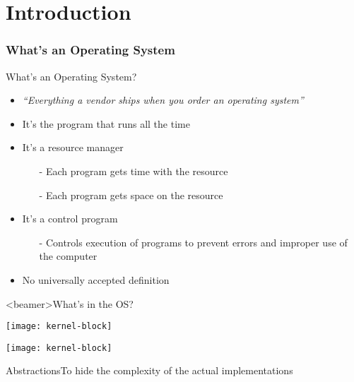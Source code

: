 \mode*
\part{Introduction}


\section{What's an Operating System}

\begin{frame}{What's an Operating System?}
  \begin{itemize}
  \item \emph{``Everything a vendor ships when you order an operating system''}
  \item It's the program that runs all the time
  \item It's a \alert{resource manager}
    \begin{itemize}
    \item[-] Each program gets time with the resource
    \item[-] Each program gets space on the resource
    \end{itemize}
  \item It's a \alert{control program}
    \begin{itemize}
    \item[-] Controls execution of programs to prevent errors and improper use of the
      computer
    \end{itemize}
  \item No universally accepted definition
  \end{itemize}
\end{frame}

\begin{frame}<beamer>{What's in the OS?}
  \begin{center}
    \texttt{[image: kernel-block]}
  \end{center}
\end{frame}

\begin{center}
  \texttt{[image: kernel-block]}
\end{center}

\begin{frame}{Abstractions}{To hide the complexity of the actual implementations}
  \begin{center}
  \end{center}
\end{frame}

